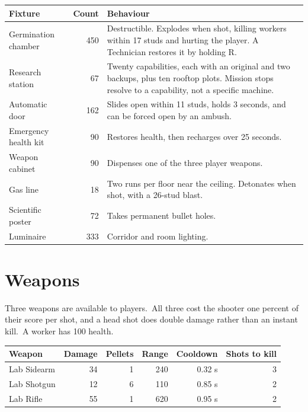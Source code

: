 \begin{center}
\begin{tabular}{@{}lrp{}@{}}
\toprule
\textbf{Fixture} & \textbf{Count} & \textbf{Behaviour} \\
\midrule
Germination chamber & 450 & Destructible. Explodes when shot, killing workers within 17 studs and hurting the player. A Technician restores it by holding R. \\
Research station & 67 & Twenty capabilities, each with an original and two backups, plus ten rooftop plots. Mission stops resolve to a capability, not a specific machine. \\
Automatic door & 162 & Slides open within 11 studs, holds 3 seconds, and can be forced open by an ambush. \\
Emergency health kit & 90 & Restores health, then recharges over 25 seconds. \\
Weapon cabinet & 90 & Dispenses one of the three player weapons. \\
Gas line & 18 & Two runs per floor near the ceiling. Detonates when shot, with a 26-stud blast. \\
Scientific poster & 72 & Takes permanent bullet holes. \\
Luminaire & 333 & Corridor and room lighting. \\
\bottomrule
\end{tabular}
\end{center}

\section{Weapons}
Three weapons are available to players.\ All three cost the shooter one percent
of their score per shot, and a head shot does double damage rather than an
instant kill.\ A worker has 100 health.\

\begin{center}
\begin{tabular}{@{}lrrrrr@{}}
\toprule
\textbf{Weapon} & \textbf{Damage} & \textbf{Pellets} & \textbf{Range} & \textbf{Cooldown} & \textbf{Shots to kill} \\
\midrule
Lab Sidearm & 34 & 1 & 240 & 0.32 s & 3 \\
Lab Shotgun & 12 & 6 & 110 & 0.85 s & 2 \\
Lab Rifle & 55 & 1 & 620 & 0.95 s & 2 \\
\bottomrule
\end{tabular}
\end{center}

